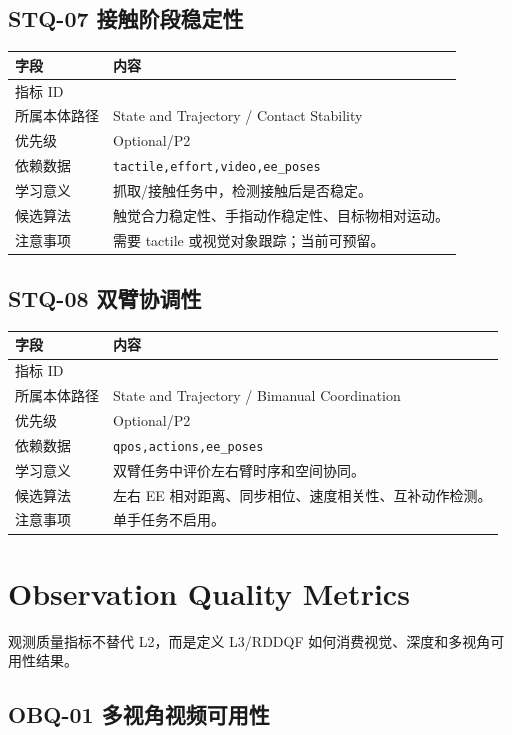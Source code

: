 \documentclass[UTF8,zihao=-4,oneside,openany]{ctexrep}
\newcommand{\Code}[1]{\texttt{#1}}
\newcommand{\MID}[1]{\texttt{\seqsplit{#1}}}
\begin{document}
\subsection{STQ-07 接触阶段稳定性}

\begin{longtable}{L{3.6cm} L{9.6cm}}
\toprule
字段 & 内容 \\
\midrule
指标 ID & \MID{STQ-07} \\
所属本体路径 & State and Trajectory / Contact Stability \\
优先级 & Optional/P2 \\
依赖数据 & \Code{tactile,effort,video,ee\_poses} \\
学习意义 & 抓取/接触任务中，检测接触后是否稳定。 \\
候选算法 & 触觉合力稳定性、手指动作稳定性、目标物相对运动。 \\
注意事项 & 需要 tactile 或视觉对象跟踪；当前可预留。 \\
\bottomrule
\end{longtable}

\subsection{STQ-08 双臂协调性}

\begin{longtable}{L{3.6cm} L{9.6cm}}
\toprule
字段 & 内容 \\
\midrule
指标 ID & \MID{STQ-08} \\
所属本体路径 & State and Trajectory / Bimanual Coordination \\
优先级 & Optional/P2 \\
依赖数据 & \Code{qpos,actions,ee\_poses} \\
学习意义 & 双臂任务中评价左右臂时序和空间协同。 \\
候选算法 & 左右 EE 相对距离、同步相位、速度相关性、互补动作检测。 \\
注意事项 & 单手任务不启用。 \\
\bottomrule
\end{longtable}

\section{Observation Quality Metrics}

观测质量指标不替代 L2，而是定义 L3/RDDQF 如何消费视觉、深度和多视角可用性结果。


\subsection{OBQ-01 多视角视频可用性}
\end{document}
